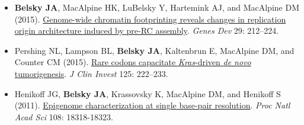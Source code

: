
\begin{resentries}

\begin{itemize}[leftmargin=!, labelindent=5pt, itemindent=-15pt]

	\item{\textbf{Belsky JA}, MacAlpine HK, LuBelsky Y, Hartemink AJ, and MacAlpine DM (2015).  \href{http://dx.doi.org/10.1101/gad.247924.114}{\color{blue} Genome-wide chromatin footprinting reveals changes in replication origin architecture induced by pre-RC assembly}.  \textit{Genes Dev} 29: 212--224.}
	\item{Pershing NL, Lampson BL, \textbf{Belsky JA}, Kaltenbrun E, MacAlpine DM, and Counter CM (2015).  \href{http://dx.doi.org/10.1172/JCI77627}{\color{blue} Rare codons capacitate \textit{Kras}-driven \textit{de novo} tumorigenesis}.  \textit{J Clin Invest} 125: 222--233.}
	\item{Henikoff JG, \textbf{Belsky JA}, Krassovsky K, MacAlpine DM, and Henikoff S (2011).  \href{http://dx.doi.org/10.1073/pnas.1110731108}{\color{blue} Epigenome characterization at single base-pair resolution}.  \textit{Proc Natl Acad Sci} 108: 18318-18323.}

\end{itemize}

\end{resentries}
